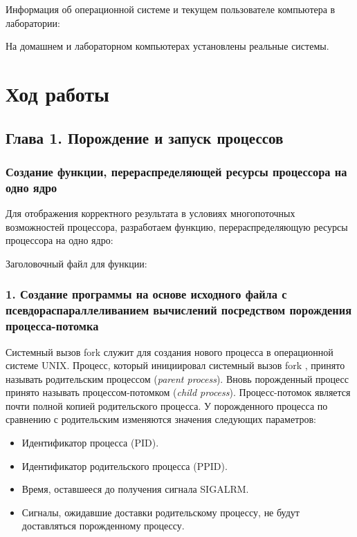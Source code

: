 \documentclass[14pt,a4paper,report]{report}
\begin{document}
Информация об операционной системе и текущем пользователе компьютера в лаборатории:



На домашнем и лабораторном компьютерах установлены реальные системы.

\section{Ход работы}

\subsection{Глава 1. Порождение и запуск процессов}

\subsubsection{Создание функции, перераспределяющей ресурсы процессора на одно ядро}

Для отображения корректного результата в условиях многопоточных возможностей процессора, разработаем функцию, перераспределяющую ресурсы процессора на одно ядро:



Заголовочный файл для функции:



\subsubsection{1. Создание программы на основе исходного файла с псевдораспараллеливанием вычислений посредством порождения процесса-потомка}

Системный вызов fork служит для создания нового процесса в операционной системе UNIX. Процесс, который инициировал системный вызов fork , принято называть родительским процессом (\emph{parent process}). Вновь порожденный процесс принято называть процессом-потомком (\emph{child process}). Процесс-потомок является почти полной копией родительского процесса. У порожденного процесса по сравнению с родительским изменяются значения следующих параметров:

\begin{itemize}
	\item Идентификатор процесса (PID).
	\item Идентификатор родительского процесса (PPID).
	\item Время, оставшееся до получения сигнала SIGALRM.
	\item Сигналы, ожидавшие доставки родительскому процессу, не будут доставляться порожденному процессу.
\end{itemize}
\end{document}
